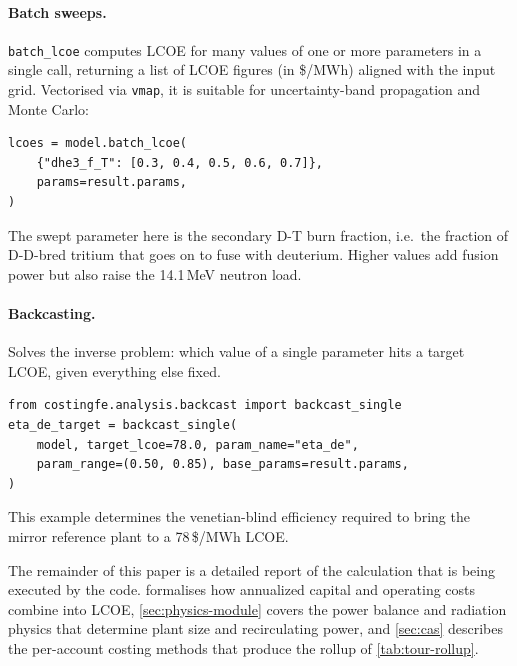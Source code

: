 \documentclass{article}
\begin{document}
\paragraph{Batch sweeps.} \texttt{batch\_lcoe} computes LCOE for many
values of one or more parameters in a single call, returning a list of
LCOE figures (in \$/MWh) aligned with the input grid. Vectorised via
\texttt{vmap}, it is suitable for uncertainty-band propagation and
Monte Carlo:

\begin{minipage}{\linewidth}
\begin{lstlisting}
lcoes = model.batch_lcoe(
    {"dhe3_f_T": [0.3, 0.4, 0.5, 0.6, 0.7]},
    params=result.params,
)
\end{lstlisting}
\end{minipage}

The swept parameter here is the secondary D-T burn fraction, i.e.\
the fraction of D-D-bred tritium that goes on to fuse with deuterium.
Higher values add fusion power but also raise the 14.1\,MeV neutron
load.

\paragraph{Backcasting.} Solves the inverse problem: which value of a
single parameter hits a target LCOE, given everything else fixed.

\begin{minipage}{\linewidth}
\begin{lstlisting}
from costingfe.analysis.backcast import backcast_single
eta_de_target = backcast_single(
    model, target_lcoe=78.0, param_name="eta_de",
    param_range=(0.50, 0.85), base_params=result.params,
)
\end{lstlisting}
\end{minipage}

This example determines the venetian-blind efficiency required to bring the
mirror reference plant to a 78\,\$/MWh LCOE.

The remainder of this paper is a detailed report of the calculation
that is being executed by the code. \Cref{sec:lcoe} formalises how
annualized capital and operating costs combine into LCOE,
\cref{sec:physics-module} covers the power balance and radiation
physics that determine plant size and recirculating power, and
\cref{sec:cas} describes the per-account costing methods that produce
the rollup of \cref{tab:tour-rollup}.

\end{document}
